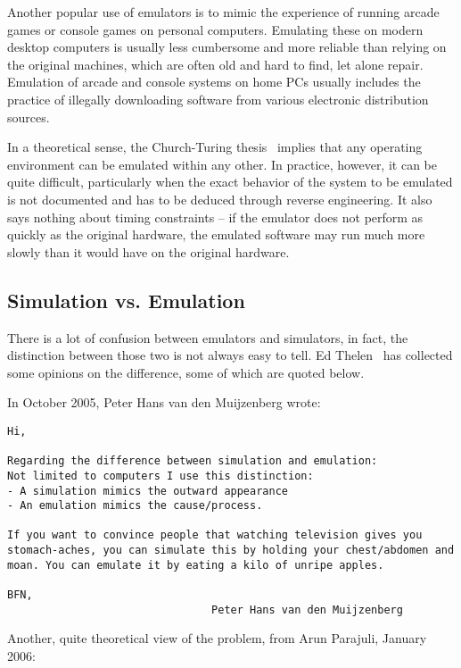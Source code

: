 Another  popular use of emulators is to mimic the experience of running arcade
games or console games on personal computers. Emulating these on modern desktop
computers is usually less cumbersome and more reliable than relying on the
original machines, which are often old and hard to find, let alone repair.
Emulation of arcade and console systems on home PCs usually includes the
practice of illegally downloading software from various electronic distribution
sources.

In a theoretical sense, the Church-Turing thesis~\cite{church-turing}
implies that any operating environment can be emulated within any other. In
practice, however, it can be quite difficult, particularly when the exact
behavior of the system to be emulated is not documented and has to be deduced
through reverse engineering. It also says nothing about timing constraints --
if the emulator does not perform as quickly as the original hardware, the
emulated software may run much more slowly than it would have on the original
hardware.


\subsection{Simulation vs. Emulation}

There is a lot of confusion between emulators and simulators, in fact, the
distinction between those two is not always easy to tell. Ed
Thelen~\cite{emu-vs-simu} has collected some opinions on the difference, some of
which are quoted below.

In October 2005, Peter Hans van den Muijzenberg wrote:

\begin{verbatim}
Hi,

Regarding the difference between simulation and emulation:
Not limited to computers I use this distinction:
- A simulation mimics the outward appearance
- An emulation mimics the cause/process.

If you want to convince people that watching television gives you
stomach-aches, you can simulate this by holding your chest/abdomen and
moan. You can emulate it by eating a kilo of unripe apples.

BFN,
                                Peter Hans van den Muijzenberg
\end{verbatim}

Another, quite theoretical view of the problem, from Arun Parajuli, January
2006:

